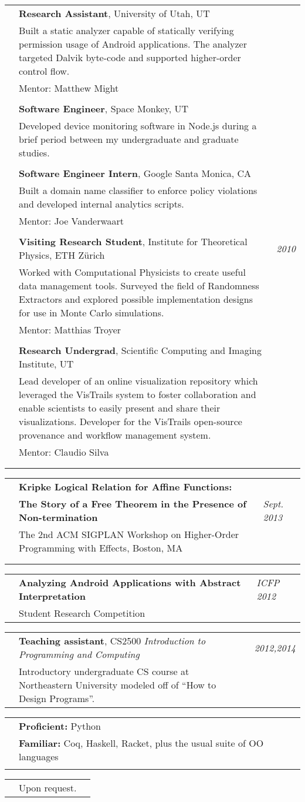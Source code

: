 \documentclass[10pt]{article}
\makeatletter
\newcommand{\category}[2]{
\begin{center}
\vskip 6pt
\begin{tabular*}{\textwidth}{@{}p{0.75in}@{\quad\;\;}p{4in}@{\quad\quad}p{0.7in}}
\vcrush[t]{1in}{\textsc{#1}} &
#2
\end{tabular*}
\end{center}
}
\newcommand{\n}{\\ & }
\newcommand{\nn}{\\ \n}
\newcommand{\DT}[1]{&\hspace{\stretch 1}\textit{#1}}
\newcommand{\conf}[1]{&\hspace{\stretch 1}\crushr{\textit{#1}}}
\makeatother
\begin{document}
\category{Programming \mbox{~\textit{\&} Research} \mbox{experience}}{

{\bf Research Assistant}, University of Utah, UT \conf{Summer 2012}\n
Built a static analyzer capable of statically verifying permission usage of Android applications.
The analyzer targeted Dalvik byte-code and supported higher-order control flow.\n
Mentor: Matthew Might\nn

{\bf Software Engineer}, Space Monkey, UT \conf{Summer 2012}\n
Developed device monitoring software in Node.js during a brief period between my undergraduate and graduate studies.\nn

{\bf Software Engineer Intern}, Google Santa Monica, CA \conf{2011}\n
Built a domain name classifier to enforce policy violations and developed
internal analytics scripts.\n
Mentor: Joe Vanderwaart\nn

{\bf Visiting Research Student}, Institute for Theoretical Physics, ETH Z\"urich \DT{2010}\n
Worked with Computational Physicists to create useful data management
tools.  Surveyed the field of Randomness Extractors and explored possible
implementation designs for use in Monte Carlo simulations.\n
Mentor: Matthias Troyer\nn

{\bf Research Undergrad}, Scientific Computing and Imaging Institute, UT \conf{2009 -- 2010}\n
Lead developer of an online visualization repository which leveraged the
VisTrails system to foster collaboration and enable scientists to easily
present and share their visualizations.  Developer for the VisTrails
open-source provenance and workflow management system.\n
Mentor: Claudio Silva\nn

}



\category{Talks}{

{\bf  Kripke Logical Relation for Affine Functions:}\n
{\bf The Story of a Free Theorem in the Presence of Non-termination} \DT{Sept. 2013}\n
The 2nd ACM SIGPLAN Workshop on Higher-Order Programming with Effects, Boston, MA\nn
}


\category{Posters}{
{\bf Analyzing Android Applications with Abstract Interpretation} \DT{ICFP 2012}\n
Student Research Competition
}



\category{Teaching \mbox{experience}}{
{\bf Teaching assistant}, CS2500 \textit{Introduction to Programming and Computing} \DT{2012,2014}\n
Introductory undergraduate CS course at Northeastern University modeled off of ``How to Design Programs''.
}

\category{Technical Skills}{
  {\bf Proficient:} Python \n
  {\bf Familiar:} Coq, Haskell, Racket, plus the usual suite of OO languages \n
}

\category{References}{
  Upon request.
}
\end{document}
